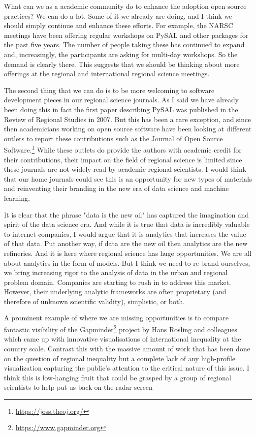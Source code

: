 \documentclass[11pt]{article}
\begin{document}
What can we as a academic community do to enhance the adoption open source
practices? We can do a lot. Some of it we already are doing, and I think we
should simply continue and enhance these efforts. For example, the NARSC
meetings have been offering regular workshops on PySAL and other packages
for the past five years. The number of people taking these has
continued to expand and, increasingly, the participants are asking for
multi-day workshops. So the demand is clearly there. This suggests that we
should be thinking about more offerings at the regional and international
regional science meetings.

The second thing that we can do is to be more welcoming to software development
pieces in our regional science journals. As I said we have already been doing
this in fact the first paper describing PySAL was published in the Review of
Regional Studies in 2007. But this has been a rare exception, and since then
academicians working on open source software have been looking at different
outlets to report these contributions such as the Journal of Open Source
Software.\footnote{\url{https://joss.theoj.org/}} While these outlets do provide the authors with academic credit for
their contributions, their impact on the field of regional science is limited
since these journals are not widely read by academic regional scientists. I
would think that our home journals could see this is an opportunity for new
types of materials and reinventing their branding in the new era of  
data science and machine learning. 


It is clear that the phrase "data is the new oil" has captured the imagination
and spirit of the data science era. And while it is true that data is incredibly
valuable to internet companies, I would argue that it is analytics that
increases the value of that data. Put another way, if data are the new oil then
analytics are the new refineries. And it is here where regional science has huge
opportunities. We are all about analytics in the form of models. But I think we
need to re-brand ourselves, we bring increasing rigor to the analysis of data in
the urban and regional problem domain.  Companies are starting to rush in
to address this market. However, their underlying analytic frameworks are often
proprietary (and therefore of unknown scientific validity), simplistic, or both.

A prominent example of where we are missing opportunities is to compare
fantastic visibility of the Gapminder\footnote{\url{https://www.gapminder.org}} project by
Hans Rosling and colleagues which came up with innovative visualisations of
international inequality at the country scale. Contrast this with the massive
amount of work that has been done on the question of regional inequality but
a complete lack of any high-profile visualization capturing the public's
attention to the critical nature of this issue. I think this is low-hanging
fruit that could be grasped by a group of regional scientists to help put
us back on the radar screen
\end{document}
